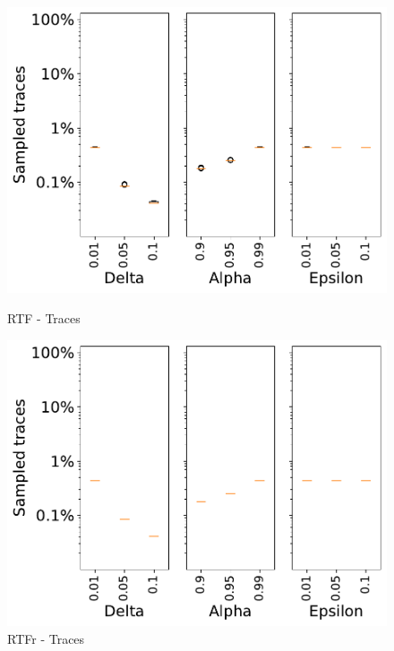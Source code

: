 \documentclass[landscape]{article}
\begin{document}
\begin{figure}[!htb]
\begin{minipage}{0.2\textwidth}
		\includegraphics[width=1.0\textwidth]{../Road_Traffic_Fines_Management_Process/Road_Traffic_Fines_Management_Process_param_traces.pdf}
		\caption{RTF - Traces}
	\end{minipage}
	\hfill
	\begin{minipage}{0.2\textwidth}
		\includegraphics[width=1.0\textwidth]{../RTFM_model2/RTFM_model2_param_traces.pdf}
		\caption{RTFr - Traces}
	\end{minipage}
\end{figure}
\vspace{-0.5cm}
\end{document}
